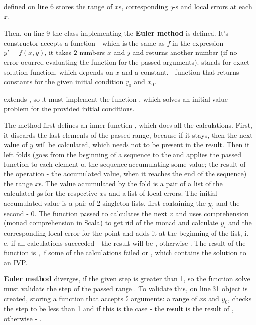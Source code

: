 \documentclass[12pt,a4paper,titlepage]{article}
\begin{document}
   defined on line 6 stores the range of $x$s, corresponding $y$-s and local errors at each $x$.

  Then, on line 9 the class implementing the \textbf{Euler method} is defined. It's constructor accepts a function  - which is the same as $f$ in the expression $y' = f(x, y)$, it takes 2 numbers $x$ and $y$ and returns another number (if no error ocurred evaluating the function for the passed arguments).  stands for exact solution function, which depends on $x$ and a constant.  - function that returns constants for the given initial condition $y_0$ and $x_0$.

   extends , so it must implement the function , which solves an initial value problem for the provided initial conditions.

  The method  first defines an inner function , which does all the calculations. First, it discards the last elements of the passed range, because if it stays, then the next value of $y$ will be calculated, which needs not to be present in the result. Then it left folds (goes from the beginning of a sequence to the and applies the passed function to each element of the sequence accumulating some value; the result of the operation - the accumulated value, when it reaches the end of the sequence) the range $x$s. The value accumulated by the fold is a pair of a list of the calculated $y$s for the respective $x$s and a list of local errors. The initial accumulated value is a pair of 2 singleton lists, first containing the $y_0$ and the second - 0. The function passed to  calculates the next $x$ and uses \href{https://docs.scala-lang.org/tutorials/FAQ/yield.html}{ comprehension} (monad comprehension in Scala) to get rid of the  monad and calculate $y_i$ and the corresponding local error for the point and adds it at the beginning of the list, i. e. if all calculations succeeded - the result will be , otherwise . The result of the function is , if some of the calculations failed or , which contains the solution to an IVP.

  \textbf{Euler method} diverges, if the given step is greater than 1, so the function solve must validate the step of the passed range . To validate this, on line 31  object is created, storing a function that accepts 2 arguments: a range of $x$s and $y_0$, checks the step to be less than 1 and if this is the case - the result is the result of , otherwise - .
\end{document}
